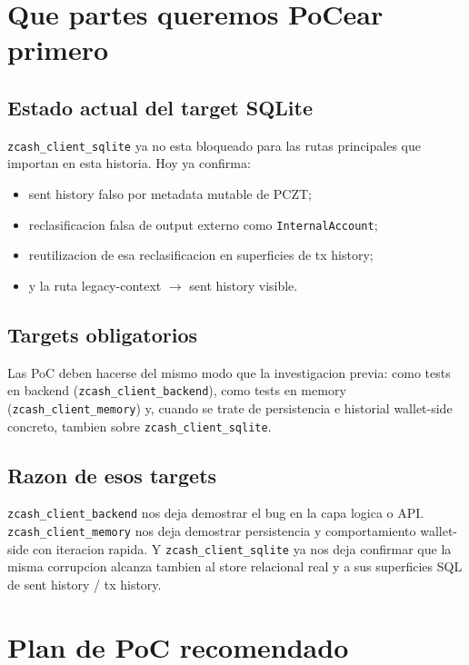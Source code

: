 \documentclass[11pt,a4paper]{article}
\begin{document}
\section{Que partes queremos PoCear primero}

\subsection{Estado actual del target SQLite}

\texttt{zcash\_client\_sqlite} ya no esta bloqueado para las rutas principales
que importan en esta historia. Hoy ya confirma:

\begin{itemize}[leftmargin=2em]
    \item sent history falso por metadata mutable de PCZT;
    \item reclasificacion falsa de output externo como
    \texttt{InternalAccount};
    \item reutilizacion de esa reclasificacion en superficies de tx history;
    \item y la ruta legacy-context $\rightarrow$ sent history visible.
\end{itemize}

\subsection{Targets obligatorios}

Las PoC deben hacerse del mismo modo que la investigacion previa: como tests
en backend (\texttt{zcash\_client\_backend}), como tests en memory
(\texttt{zcash\_client\_memory}) y, cuando se trate de persistencia e
historial wallet-side concreto, tambien sobre
\texttt{zcash\_client\_sqlite}.

\subsection{Razon de esos targets}

\texttt{zcash\_client\_backend} nos deja demostrar el bug en la capa logica o
API. \texttt{zcash\_client\_memory} nos deja demostrar persistencia y
comportamiento wallet-side con iteracion rapida. Y
\texttt{zcash\_client\_sqlite} ya nos deja confirmar que la misma corrupcion
alcanza tambien al store relacional real y a sus superficies SQL de sent
history / tx history.

\section{Plan de PoC recomendado}
\end{document}
